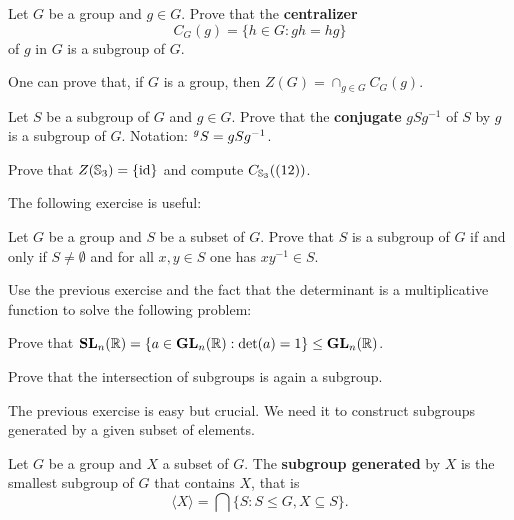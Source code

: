 \begin{exercise}
        Let $G$ be a group and $g\in G$. Prove that
        the \textbf{centralizer}
        \[
                C_G(g)=\{h\in G:gh=hg\}
        \]
        of $g$ in $G$ is a subgroup of $G$. 
\end{exercise}

One can prove that, if $G$ is a group, then
$Z(G)=\cap_{g\in G}C_G(g)$. 

\begin{exercise}
        \label{xca:conjugate_subgroup}
        Let $S$ be a subgroup of $G$ and $g\in G$. Prove that
        the \textbf{conjugate} $gSg^{-1}$
        of $S$ by $g$ is a subgroup of $G$. 
        Notation: $\prescript{g}{}S=gSg^{-1}$.
\end{exercise}


\begin{exercise}
        Prove that $Z(\mathbb{S}_3)=\{\operatorname{id}\}$ and compute $C_{\mathbb{S}_3}((12))$.
\end{exercise}

The following exercise is useful: 

\begin{exercise}
        Let $G$ be a group and $S$ be a subset of $G$. 
        Prove that $S$ is a subgroup of $G$ if and only if 
        $S\ne\emptyset$ and for all $x,y\in S$ one has
        $xy^{-1}\in S$.
\end{exercise}

Use the previous exercise and
the fact that the determinant is a multiplicative function
to solve the following problem:

\begin{exercise}
\label{xca:SL_subgroup}
Prove that $\mathbf{SL}_n(\mathbb{R})=\{a\in\mathbf{GL}_n(\mathbb{R}):\det(a)=1\}\leq\mathbf{GL}_n(\mathbb{R})$. 
\end{exercise}

\begin{exercise}
\label{xca:intersection}
    Prove that the intersection of subgroups is again a subgroup.
\end{exercise}

The previous exercise is easy but crucial. We need it 
to construct subgroups generated 
by a given subset of elements. 

\begin{definition}
        Let $G$ be a group and $X$ a subset of $G$. The \textbf{subgroup
        generated} by $X$ is the smallest subgroup of $G$ that contains
        $X$, that is 
        \[
            \langle X\rangle=\bigcap\{S:S\leq G,X\subseteq S\}.
        \]
\end{definition}

